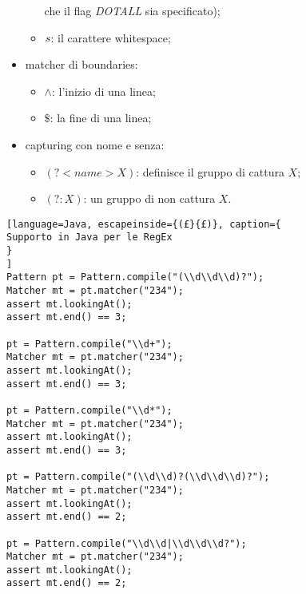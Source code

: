 \begin{itemize}
\begin{itemize}
        che il flag \emph{DOTALL} sia specificato);
      \item $\\s$: il carattere whitespace;
    \end{itemize}
  \item matcher di boundaries:
    \begin{itemize}
      \item $\wedge$: l'inizio di una linea;
      \item $\$$: la fine di una linea;
    \end{itemize}
  \item capturing con nome e senza:
    \begin{itemize}
      \item $(?<name>X)$: definisce il gruppo di cattura $X$;
      \item $(?:X)$: un gruppo di non cattura $X$.
    \end{itemize}
\end{itemize}

\begin{lstlisting}[language=Java, escapeinside={(£}{£)}, caption={
Supporto in Java per le RegEx
}
]
Pattern pt = Pattern.compile("(\\d\\d\\d)?");
Matcher mt = pt.matcher("234");
assert mt.lookingAt();
assert mt.end() == 3;

pt = Pattern.compile("\\d+");
Matcher mt = pt.matcher("234");
assert mt.lookingAt();
assert mt.end() == 3;

pt = Pattern.compile("\\d*");
Matcher mt = pt.matcher("234");
assert mt.lookingAt();
assert mt.end() == 3;

pt = Pattern.compile("(\\d\\d)?(\\d\\d\\d)?");
Matcher mt = pt.matcher("234");
assert mt.lookingAt();
assert mt.end() == 2;

pt = Pattern.compile("\\d\\d|\\d\\d\\d?");
Matcher mt = pt.matcher("234");
assert mt.lookingAt();
assert mt.end() == 2;
\end{lstlisting}


